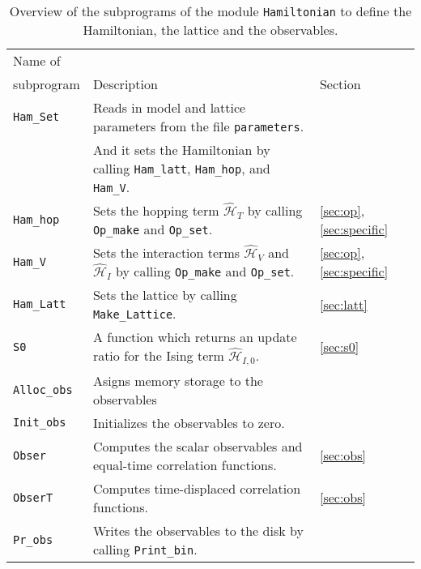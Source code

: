 %
\begin{table}[h]
   \begin{tabular}{l l l}
    Name of &  &  \\
    subprogram & Description & Section \\\hline
    \texttt{Ham\_Set}  & Reads in model and lattice parameters from the file \texttt{parameters}. \\
                       & And it sets the Hamiltonian by calling \texttt{Ham\_latt}, \texttt{Ham\_hop}, and \texttt{Ham\_V}. & \\
    \texttt{Ham\_hop}  & Sets the hopping term  $\hat{\mathcal{H}}_{T}$ by calling \texttt{Op\_make} and \texttt{Op\_set}. & \ref{sec:op}, \ref{sec:specific}\\
    \texttt{Ham\_V}    & Sets the interaction terms  $\hat{\mathcal{H}}_{V}$ and $\hat{\mathcal{H}}_{I}$ 
                         by calling \texttt{Op\_make} and \texttt{Op\_set}.& \ref{sec:op}, \ref{sec:specific}\\  
    \texttt{Ham\_Latt} & Sets the lattice by calling \texttt{Make\_Lattice}.& \ref{sec:latt}\\
    \texttt{S0}        & A function which returns an update ratio for the Ising term $\hat{\mathcal{H}}_{I,0}$. 
    & \ref{sec:s0} \\
    \texttt{Alloc\_obs} & Asigns memory storage to the observables & \\
    \texttt{Init\_obs}  & Initializes the observables to zero. & \\
    \texttt{Obser}      & Computes the scalar observables and equal-time correlation functions. & \ref{sec:obs} \\
    \texttt{ObserT}     & Computes time-displaced correlation functions. & \ref{sec:obs}\\
    \texttt{Pr\_obs}    & Writes the observables to the disk by calling \texttt{Print\_bin}.   
    
   \end{tabular}
   \caption{   Overview of the subprograms of the  module \texttt{Hamiltonian} to define the Hamiltonian, the lattice and the observables.
    \label{table:hamiltonian}}
\end{table}
%

